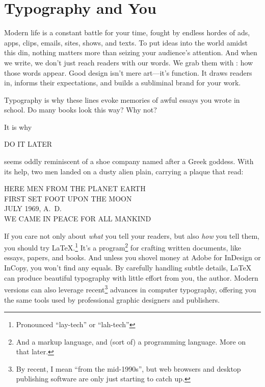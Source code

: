 \chapter{Typography and You}
\label{typography}

Modern life is a constant battle for your time,
fought by endless hordes of ads, apps, clips, emails, sites, shows, and texts.
To put ideas into the world amidst this din,
nothing matters more than seizing
your audience's attention.
And when we write, we don't just reach readers with our words.
We grab them with : how those words appear.
Good design isn't mere art---it's function.
It draws readers in,
informs their expectations, and builds a subliminal brand for your
work.\punckern{}
\begin{leftfigure}
\fontsize{12bp}{24bp}\selectfont\raggedright
Typography is why these lines evoke memories of awful essays
you wrote in school.
Do many books look this way? Why not?
\end{leftfigure}
\medskip

\noindent It is why
\begin{leftfigure}
\Large DO IT LATER
\end{leftfigure}
seems oddly reminiscent of a shoe company named after a Greek goddess.
With its help,\punckern{}
two men landed on a dusty alien plain, carrying a plaque that read:
\begin{center}
HERE MEN FROM THE PLANET EARTH \\
FIRST SET FOOT UPON THE MOON \\
JULY 1969, A.~D. \\
WE CAME IN PEACE FOR ALL MANKIND
\end{center}

If you care not only about \emph{what} you tell your readers, but also \emph{how}
you tell them, you should try \LaTeX.\punckern\footnote{Pronounced ``lay-tech''
or ``lah-tech''}
It's a program\footnote{And a markup language,
and (sort of) a programming language.
More on that later.}
for crafting written documents, like essays, papers, and books.
And unless you shovel money at Adobe for InDesign or InCopy,
you won't find any equals.
By carefully handling subtle details,
\LaTeX{} can produce beautiful typography
with little effort from you, the author.
Modern versions can also leverage recent\footnote{By recent,
I mean ``from the mid-1990s''\quotekern, but web browsers and desktop publishing
software are only just starting to catch up.} advances in computer typography,
offering you the same tools used by professional graphic designers and
publishers.


